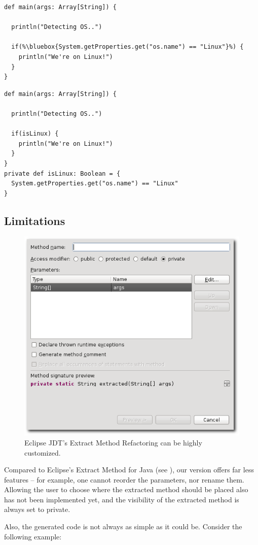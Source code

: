 \documentclass[10pt,a4paper,oneside]{scrreprt}
\begin{document}
\begin{lstlisting}
def main(args: Array[String]) {

  println("Detecting OS..")
  
  if(%\bluebox{System.getProperties.get("os.name") == "Linux"}%) {
    println("We're on Linux!")
  }
}
\end{lstlisting}
\begin{lstlisting}
def main(args: Array[String]) {

  println("Detecting OS..")
  
  if(isLinux) {
    println("We're on Linux!")
  }
}
private def isLinux: Boolean = {
  System.getProperties.get("os.name") == "Linux"
}
\end{lstlisting}

\subsection{Limitations}

\begin{figure}
  \centering
  \includegraphics[width=0.6\linewidth]{extract_method_java_screenshot_1.png}
  \caption{Eclipse JDT's Extract Method Refactoring can be highly customized.}
  \label{figure:extract-method-java-screenshot-1}
\end{figure}


Compared to Eclipse's Extract Method for Java (see ), our version offers far less features -- for example, one cannot reorder the parameters, nor rename them. Allowing the user to choose where the extracted method should be placed also has not been implemented yet, and the visibility of the extracted method is always set to private.

Also, the generated code is not always as simple as it could be. Consider the following example:
\end{document}
